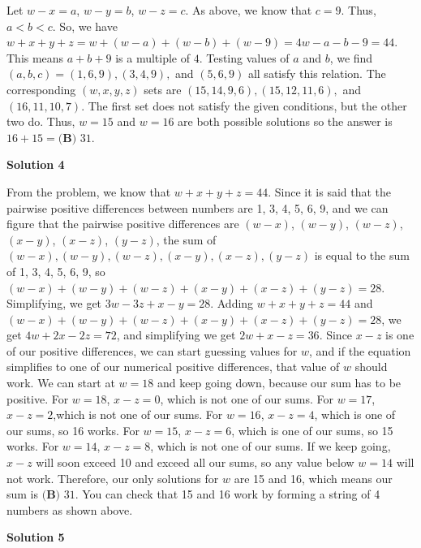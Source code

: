 \begin{enumerate}
Let $w - x = a$, $w - y = b$, $w - z = c$. As above, we know that $c = 9$. Thus, $a < b < c$. So, we have $w + x + y + z = w + (w - a) + (w - b) + (w - 9) = 4w - a - b - 9 = 44$. This means $a + b + 9$ is a multiple of $4$. Testing values of $a$ and $b$, we find $(a, b, c) = (1, 6, 9), (3, 4, 9),$ and $(5, 6, 9)$ all satisfy this relation. The corresponding $(w, x, y, z)$ sets are $(15, 14, 9, 6), (15, 12, 11, 6),$ and $(16, 11, 10, 7)$. The first set does not satisfy the given conditions, but the other two do. Thus, $w = 15$ and $w = 16$ are both possible solutions so the answer is $16+15=\boxed{\textbf{(B) }31}$.

 



\textbf{Solution 4}

From the problem, we know that $w+x+y+z=44$. Since it is said that the pairwise positive differences between numbers are 1, 3, 4, 5, 6, 9, and we can figure that the pairwise positive differences are $(w-x)$, $(w-y)$, $(w-z)$, $(x-y)$, $(x-z)$, $(y-z)$, the sum of $(w-x), (w-y), (w-z), (x-y), (x-z), (y-z)$ is equal to the sum of 1, 3, 4, 5, 6, 9, so $(w-x)+(w-y)+(w-z)+(x-y)+(x-z)+(y-z)=28$. Simplifying, we get $3w-3z+x-y=28$. Adding $w+x+y+z=44$ and $(w-x)+(w-y)+(w-z)+(x-y)+(x-z)+(y-z)=28$, we get $4w+2x-2z=72$, and simplifying we get $2w+x-z=36$. Since $x-z$ is one of our positive differences, we can start guessing values for $w$, and if the equation simplifies to one of our numerical positive differences, that value of $w$ should work. We can start at $w=18$ and keep going down, because our sum has to be positive. For $w=18$, $x-z=0$, which is not one of our sums. For $w=17$, $x-z=2$,which is not one of our sums. For $w=16$, $x-z=4$, which is one of our sums, so 16 works. For $w=15$, $x-z=6$, which is one of our sums, so 15 works. For $w=14$, $x-z=8$, which is not one of our sums. If we keep going, $x-z$ will soon exceed 10 and exceed all our sums, so any value below $w=14$ will not work. Therefore, our only solutions for $w$ are 15 and 16, which means our sum is $\boxed{\textbf{(B) }31}$. You can check that 15 and 16 work by forming a string of 4 numbers as shown above.

 



\textbf{Solution 5}


\end{enumerate}

